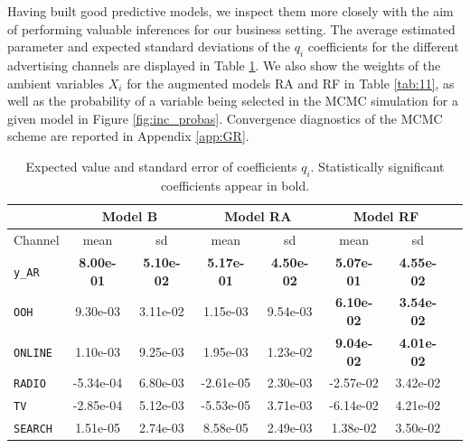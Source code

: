 Having built good predictive models, we inspect them more closely with the aim of performing valuable inferences for our business setting. The average estimated parameter and expected standard deviations of the $q_i$ coefficients for the different advertising channels are displayed in Table \ref{tab:1}. We also show the weights of the ambient variables $X_i$ for the augmented models RA and RF in Table \ref{tab:11}, as well as the probability of a variable being selected in the MCMC simulation for a given model in Figure \ref{fig:inc_probas}. Convergence diagnostics of the MCMC scheme are reported in Appendix \ref{app:GR}.




\begin{table}[h]
\centering
\begin{tabular}{ |l|c|c|c|c|c|c|c| }
  \hline
  & \multicolumn{2}{|c|}{Model B} & \multicolumn{2}{|c|}{Model RA} & \multicolumn{2}{|c|}{Model RF}\\
  \hline
  Channel & mean & sd & mean & sd & mean & sd\\
  \hline
  \texttt{y\_AR} & \textbf{8.00e-01} & \textbf{5.10e-02} &  \textbf{5.17e-01} &  \textbf{4.50e-02} &  \textbf{5.07e-01} &  \textbf{4.55e-02}   \\
  \texttt{OOH} & 9.30e-03 & 3.11e-02 & 1.15e-03 & 9.54e-03  & \textbf{6.10e-02} &  \textbf{3.54e-02}\\
  \texttt{ONLINE} & 1.10e-03 & 9.25e-03  & 1.95e-03 &  1.23e-02 & \textbf{9.04e-02} & \textbf{4.01e-02}\\
  \texttt{RADIO} & -5.34e-04 & 6.80e-03  &-2.61e-05 & 2.30e-03 &   -2.57e-02 & 3.42e-02\\
  \texttt{TV} & -2.85e-04 & 5.12e-03 & -5.53e-05 & 3.71e-03  & -6.14e-02 & 4.21e-02\\
  \texttt{SEARCH} & 1.51e-05  & 2.74e-03  & 8.58e-05 & 2.49e-03  & 1.38e-02 & 3.50e-02 \\
    \hline
\end{tabular} \caption{Expected value and standard error of coefficients $q_i$. Statistically significant coefficients appear in bold.}\label{tab:1}
\end{table}

